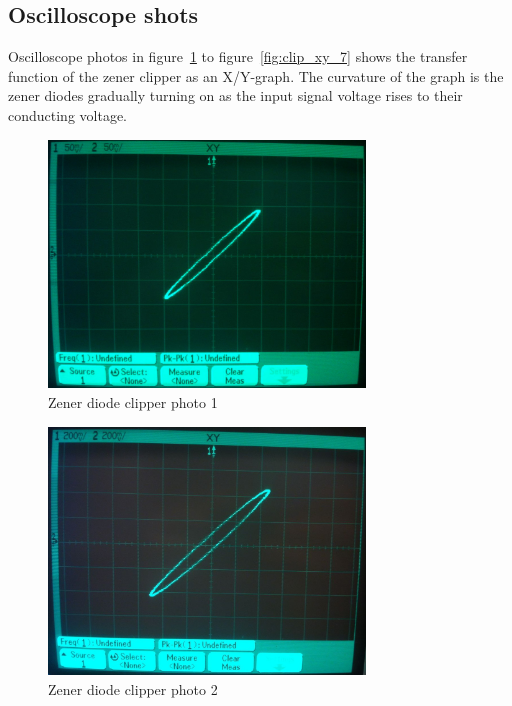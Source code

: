 \documentclass[11pt,a4paper]{article}
\begin{document}
\subsection{Oscilloscope shots}\label{clipper-oscilloscope-shots}
Oscilloscope photos in figure~\ref{fig:clip_xy_1} to figure~\ref{fig:clip_xy_7}
shows the transfer function of the zener clipper as an X/Y-graph.
The curvature of the graph is the zener diodes gradually turning on as the
input signal voltage rises to their conducting voltage.

\begin{figure}[htbp]
    \centering
    \includegraphics[width=0.75\textwidth]{img/clip_xy_1.jpg}
    \caption{Zener diode clipper photo 1}
    \label{fig:clip_xy_1}
\end{figure}

\begin{figure}[htbp]
    \centering
    \includegraphics[width=0.75\textwidth]{img/clip_xy_2.jpg}
    \caption{Zener diode clipper photo 2}
    \label{fig:clip_xy_2}
\end{figure}
\end{document}

